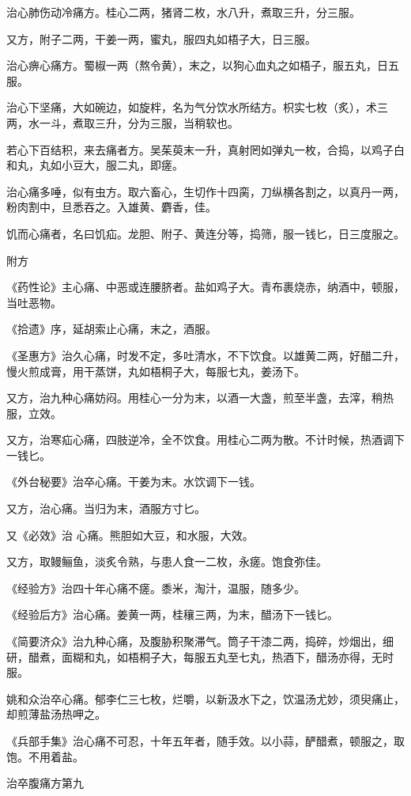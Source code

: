\documentclass[12pt,UTF8]{ctexbook}
\begin{document}
治心肺伤动冷痛方。桂心二两，猪肾二枚，水八升，煮取三升，分三服。

又方，附子二两，干姜一两，蜜丸，服四丸如梧子大，日三服。

治心痹心痛方。蜀椒一两（熬令黄），末之，以狗心血丸之如梧子，服五丸，日五服。

治心下坚痛，大如碗边，如旋柈，名为气分饮水所结方。枳实七枚（炙），术三两，水一斗，煮取三升，分为三服，当稍软也。

若心下百结积，来去痛者方。吴茱萸末一升，真射罔如弹丸一枚，合捣，以鸡子白和丸，丸如小豆大，服二丸，即瘥。

治心痛多唾，似有虫方。取六畜心，生切作十四脔，刀纵横各割之，以真丹一两，粉肉割中，旦悉吞之。入雄黄、麝香，佳。

饥而心痛者，名曰饥疝。龙胆、附子、黄连分等，捣筛，服一钱匕，日三度服之。

附方

《药性论》主心痛、中恶或连腰脐者。盐如鸡子大。青布裹烧赤，纳酒中，顿服，当吐恶物。

《拾遗》序，延胡索止心痛，末之，酒服。

《圣惠方》治久心痛，时发不定，多吐清水，不下饮食。以雄黄二两，好醋二升，慢火煎成膏，用干蒸饼，丸如梧桐子大，每服七丸，姜汤下。

又方，治九种心痛妨闷。用桂心一分为末，以酒一大盏，煎至半盏，去滓，稍热服，立效。

又方，治寒疝心痛，四肢逆冷，全不饮食。用桂心二两为散。不计时候，热酒调下一钱匕。

《外台秘要》治卒心痛。干姜为末。水饮调下一钱。

又方，治心痛。当归为末，酒服方寸匕。

又《必效》治 心痛。熊胆如大豆，和水服，大效。

又方，取鳗鲡鱼，淡炙令熟，与患人食一二枚，永瘥。饱食弥佳。

《经验方》治四十年心痛不瘥。黍米，淘汁，温服，随多少。

《经验后方》治心痛。姜黄一两，桂穰三两，为末，醋汤下一钱匕。

《简要济众》治九种心痛，及腹胁积聚滞气。筒子干漆二两，捣碎，炒烟出，细研，醋煮，面糊和丸，如梧桐子大，每服五丸至七丸，热酒下，醋汤亦得，无时服。

姚和众治卒心痛。郁李仁三七枚，烂嚼，以新汲水下之，饮温汤尤妙，须臾痛止，却煎薄盐汤热呷之。

《兵部手集》治心痛不可忍，十年五年者，随手效。以小蒜，酽醋煮，顿服之，取饱。不用着盐。

治卒腹痛方第九
\end{document}
